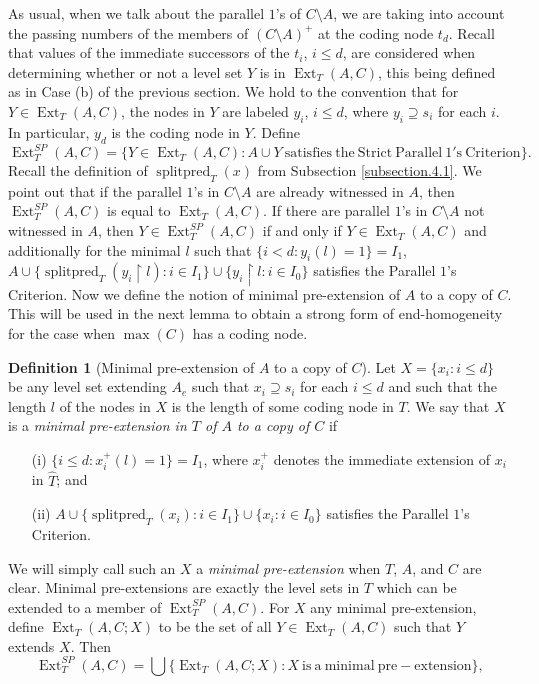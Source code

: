 \documentclass{amsart}
\theoremstyle{remark}
\theoremstyle{definition}
\newtheorem{defn}[thm]{Definition}
\theoremstyle{remark}
\newcommand{\contains}{\supseteq}
\DeclareMathOperator{\Ext}{Ext}
\DeclareMathOperator{\splitpred}{splitpred}
\newcommand{\re}{\restriction}
\newcommand{\POC}{Parallel $1$'s Criterion}
\begin{document}
As usual,
when we talk about the parallel $1$'s of $C\setminus A$, we are  taking into account  the passing numbers of the members of $(C\setminus A)^+$ at the coding node $t_d$.
Recall that values of
the immediate successors of the $t_i$, $i\le d$,
 are considered when determining whether or not a level set $Y$ is in $\Ext_T(A,C)$,
this being defined as in Case (b) of the previous section.
We hold to the convention that for $Y\in \Ext_T(A,C)$,
the nodes in $Y$ are labeled $y_i$, $i\le d$, where  $y_i\contains s_i$ for each $i$.
In particular, $y_d$ is the coding node in $Y$.
Define
\begin{equation}
\Ext_T^{SP}(A,C)=\{Y\in\Ext_T(A,C):A\cup Y\mathrm{\
  satisfies\ the\ Strict\ Parallel\ } 1\mathrm{'s\ Criterion}\}.
\end{equation}
Recall  the
definition of $\splitpred_T(x)$ from
 Subsection
 \ref{subsection.4.1}.
We point out that if the parallel $1$'s in $C\setminus A$ are already witnessed in $A$,
then $\Ext_T^{SP}(A,C)$ is equal to $\Ext_T(A,C)$.
If there are parallel $1$'s in $C\setminus A$  not witnessed in $A$,
then $Y\in  \Ext_T^{SP}(A,C)$  if and only if $Y\in \Ext_T(A,C)$ and  additionally
 for the minimal $l$ such that $\{i<d:y_i(l)=1\}=I_1$,
$A\cup \{\splitpred_T(y_i\re l):i\in I_1\}\cup\{y_i\re l:i\in I_0\}$ satisfies the \POC.
Now we define the notion of minimal pre-extension of $A$ to a copy of $C$.
This  will be used in the next lemma to obtain a strong form of end-homogeneity for the case when $\max(C)$ has a coding node.



\begin{defn}[Minimal pre-extension of $A$ to a copy of $C$]
Let
 $X=\{x_i:i\le d\}$  be any   level set extending $A_e$ such that $x_i\contains s_i$ for each $i\le d$
and such that
 the length $l$ of the nodes in $X$
is the length of some coding node in $T$.
We say that  $X$ is  a
{\em minimal pre-extension in $T$ of $A$ to a copy of $C$} if
\begin{enumerate}
\item[(i)]
$\{i\le d:x_i^+(l)=1\}=I_1$,
where
$x_i^+$ denotes the immediate extension of $x_i$ in $\widehat{T}$; and
\item[(ii)]
$A\cup\{\splitpred_T(x_i):i\in I_1\}\cup\{x_i:i\in I_0\}$
satisfies the \POC.
\end{enumerate}
\end{defn}
We will simply call such an $X$ a
 {\em minimal pre-extension} when $T$, $A$, and $C$ are clear.
Minimal pre-extensions
are exactly the level sets  in $T$ which
 can be extended to a member of $\Ext_T^{SP}(A,C)$.
For $X$ any minimal pre-extension,
define $\Ext_T(A,C;X)$ to be
 the set of all $Y\in \Ext_T(A,C)$
such that $Y$ extends $X$.
Then
\begin{equation}
\Ext_T^{SP}(A,C)=\bigcup\{\Ext_T(A,C;X): X\mathrm{\ is\ a\ minimal\ {pre{-}extension}}\},
\end{equation}
\end{document}
